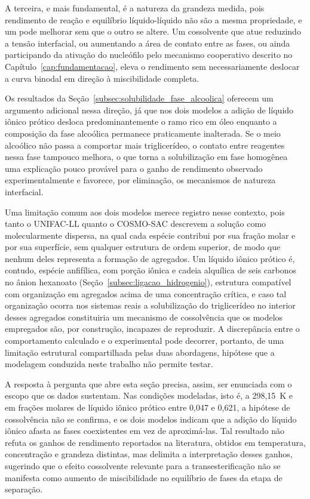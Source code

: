 A terceira, e mais fundamental, é a natureza da grandeza medida, pois rendimento de reação e equilíbrio líquido-líquido não são a mesma propriedade, e um pode melhorar sem que o outro se altere. Um cossolvente que atue reduzindo a tensão interfacial, ou aumentando a área de contato entre as fases, ou ainda participando da ativação do nucleófilo pelo mecanismo cooperativo descrito no Capítulo~\ref{cap:fundamentacao}, eleva o rendimento sem necessariamente deslocar a curva binodal em direção à miscibilidade completa.

Os resultados da Seção~\ref{subsec:solubilidade_fase_alcoolica} oferecem um argumento adicional nessa direção, já que nos dois modelos a adição de líquido iônico prótico desloca predominantemente o ramo rico em óleo enquanto a composição da fase alcoólica permanece praticamente inalterada. Se o meio alcoólico não passa a comportar mais triglicerídeo, o contato entre reagentes nessa fase tampouco melhora, o que torna a solubilização em fase homogênea uma explicação pouco provável para o ganho de rendimento observado experimentalmente e favorece, por eliminação, os mecanismos de natureza interfacial.

Uma limitação comum aos dois modelos merece registro nesse contexto, pois tanto o UNIFAC-LL quanto o COSMO-SAC descrevem a solução como molecularmente dispersa, na qual cada espécie contribui por sua fração molar e por sua superfície, sem qualquer estrutura de ordem superior, de modo que nenhum deles representa a formação de agregados. Um líquido iônico prótico é, contudo, espécie anfifílica, com porção iônica e cadeia alquílica de seis carbonos no ânion hexanoato (Seção~\ref{subsec:ligacao_hidrogenio}), estrutura compatível com organização em agregados acima de uma concentração crítica, e caso tal organização ocorra nos sistemas reais a solubilização do triglicerídeo no interior desses agregados constituiria um mecanismo de cossolvência que os modelos empregados são, por construção, incapazes de reproduzir. A discrepância entre o comportamento calculado e o experimental pode decorrer, portanto, de uma limitação estrutural compartilhada pelas duas abordagens, hipótese que a modelagem conduzida neste trabalho não permite testar.

A resposta à pergunta que abre esta seção precisa, assim, ser enunciada com o escopo que os dados sustentam. Nas condições modeladas, isto é, a 298,15~K e em frações molares de líquido iônico prótico entre 0,047 e 0,621, a hipótese de cossolvência não se confirma, e os dois modelos indicam que a adição do líquido iônico afasta as fases coexistentes em vez de aproximá-las. Tal resultado não refuta os ganhos de rendimento reportados na literatura, obtidos em temperatura, concentração e grandeza distintas, mas delimita a interpretação desses ganhos, sugerindo que o efeito cossolvente relevante para a transesterificação não se manifesta como aumento de miscibilidade no equilíbrio de fases da etapa de separação.

